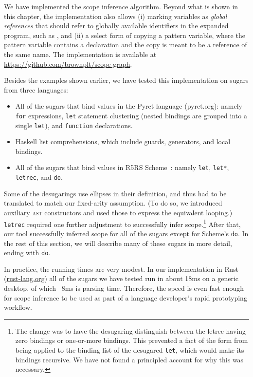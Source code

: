 We have implemented the scope inference algorithm. Beyond what is
shown in this chapter, the implementation also allows (i) marking
variables as \emph{global references} that should refer to globally
available identifiers in the expanded program, such as ,
and (ii) a select form of copying a pattern variable, where the pattern variable contains a
declaration and the copy is meant to be a reference of the same name.
The implementation is available at \url{https://github.com/brownplt/scope-graph}.

Besides the examples shown earlier, we have tested this
implementation on sugars from three languages:
\begin{itemize}
  \item All of the sugars that bind values in the Pyret language
    (pyret.org): namely \texttt{for} expressions, \texttt{let}
    statement clustering (nested bindings are grouped into a single
    \texttt{let}), and \texttt{function} declarations.
  \item Haskell list comprehensions, which include guards, generators,
    and local bindings.
  \item All of the sugars that bind values in R5RS
    Scheme~\cite{scheme5}: namely \texttt{let}, \texttt{let*},
    \texttt{letrec}, and \texttt{do}.
\end{itemize}

Some of the desugarings use ellipses in their definition, and thus had
to be translated to match our fixed-arity assumption. (To do so, we
introduced auxiliary \textsc{ast} constructors and used those to express the
equivalent looping.) \texttt{letrec}
required one further adjustment to successfully infer scope.\footnote{
  The change was to have the desugaring distinguish between the letrec
  having zero bindings or one-or-more bindings. This prevented a
  fact of the form  from being applied to the binding
  list of the desugared \texttt{let}, which would make its bindings
  recursive. We have not found a principled account for why this
  was necessary.
} After
that, our tool successfully inferred scope for all of the sugars
except for Scheme's \texttt{do}. In the rest of this section, we will
describe many of these sugars in more detail, ending with \texttt{do}.

In practice, the running times are very modest. In our implementation in
Rust (\url{rust-lang.org}) all of the sugars we have tested run in
about 18ms on a generic desktop, of which ~8ms is parsing
time.
Therefore, the speed is even fast enough for scope inference to
be used as part of a language developer's rapid prototyping workflow.

